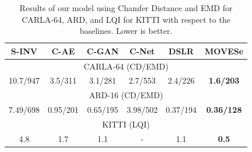 \documentclass[10pt,twocolumn,letterpaper]{article}
\begin{document}
\setlength{\tabcolsep}{1.5pt}
\begin{table}[htbp]
\centering
\begin{tabular}{|cccccc|}
\hline
\multicolumn{1}{|c|}{\textbf{S-INV}}&\multicolumn{1}{c|}{\textbf{C-AE}}&\multicolumn{1}{c|}{\textbf{C-GAN}}& \multicolumn{1}{c|}{\textbf{C-Net}}&\multicolumn{1}{c|}{\textbf{DSLR}}& \textbf{MOVESe} \\ \hline
\multicolumn{6}{|c|}{CARLA-64 (CD/EMD)}                                 \\ \hline
\multicolumn{1}{|c|}{10.7/947} & \multicolumn{1}{c|}{3.5/311} & \multicolumn{1}{c|}{3.1/281} & \multicolumn{1}{c|}{2.7/553} & \multicolumn{1}{c|}{2.4/226} & \textbf{1.6/203} \\ \hline
\multicolumn{6}{|c|}{ARD-16 (CD/EMD)}                 \\ \hline
\multicolumn{1}{|c|}{7.49/698}     & \multicolumn{1}{c|}{0.95/201}     & \multicolumn{1}{c|}{0.65/195}     & \multicolumn{1}{c|}{3.98/502}     & \multicolumn{1}{c|}{0.37/194}     & \textbf{0.36/128}  \\ \hline
\multicolumn{6}{|c|}{KITTI (LQI)}        \\ \hline
\multicolumn{1}{|c|}{4.8}        & \multicolumn{1}{c|}{1.7}         & \multicolumn{1}{c|}{1.1}         & \multicolumn{1}{c|}{-}            & \multicolumn{1}{c|}{1.1}          & \textbf{0.5}       \\ \hline
\end{tabular}
\caption{Results of our model using Chamfer Distance and EMD for CARLA-64, ARD, and LQI for KITTI with respect to the baselines. Lower is better.}
\label{tab:carlaresults}
\end{table}
\end{document}
